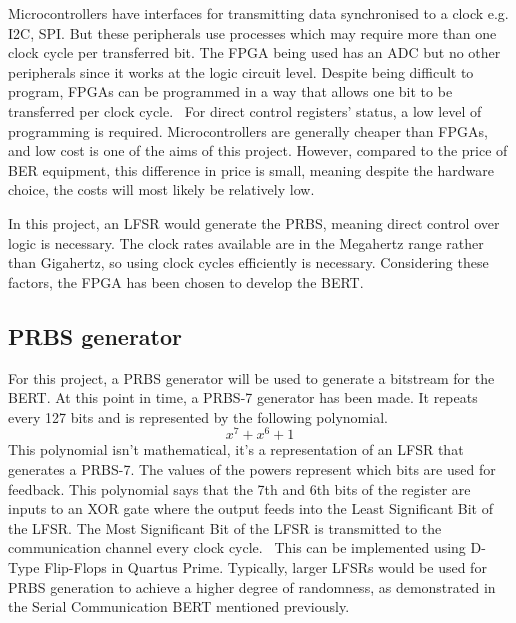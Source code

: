 \documentclass[12pt]{project_report}
\begin{document}
            Microcontrollers have interfaces for transmitting data synchronised to a clock e.g. I2C, SPI.\@
            But these peripherals use processes which may require more than one clock cycle per transferred bit.
            The FPGA being used has an ADC but no other peripherals since it works at the logic circuit level.
            Despite being difficult to program, FPGAs can be programmed in a way that allows one bit to be transferred per clock cycle.~\cite{STM2014,Terasic2012}
            For direct control registers' status, a low level of programming is required.
            Microcontrollers are generally cheaper than FPGAs, and low cost is one of the aims of this project.
            However, compared to the price of BER equipment, this difference in price is small, meaning despite the hardware choice, the costs will most likely be relatively low.~\cite{MJBasford2020,SChatterjee2023}
            
            In this project, an LFSR would generate the PRBS, meaning direct control over logic is necessary.
            The clock rates available are in the Megahertz range rather than Gigahertz, so using clock cycles efficiently is necessary.
            Considering these factors, the FPGA has been chosen to develop the BERT.\@
    
    \subsection{PRBS generator}
        For this project, a PRBS generator will be used to generate a bitstream for the BERT.\@
        At this point in time, a PRBS-7 generator has been made.
        It repeats every 127 bits and is represented by the following polynomial.~\cite{DRiccardi2011}
        \begin{equation}
            x^7 + x^6 + 1
        \end{equation}
        This polynomial isn't mathematical, it's a representation of an LFSR that generates a PRBS-7.
        The values of the powers represent which bits are used for feedback.
        This polynomial says that the 7th and 6th bits of the register are inputs to an XOR gate where the output feeds into the Least Significant Bit of the LFSR.\@
        The Most Significant Bit of the LFSR is transmitted to the communication channel every clock cycle.~\cite{DRiccardi2011,MGeorge2007}
        This can be implemented using D-Type Flip-Flops in Quartus Prime.
        Typically, larger LFSRs would be used for PRBS generation to achieve a higher degree of randomness, as demonstrated in the Serial Communication BERT mentioned previously.~\cite{MJBasford2020}
\end{document}

